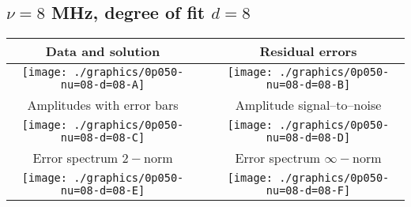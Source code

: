 

% 

\clearpage{}
\break{}

\subsection{$\nu = 8$ MHz, degree of fit $d = 8$}

\begin{table}[h]
    \begin{center}
        \begin{tabular}{ccc}
            Data and solution & \quad & Residual errors \\\hline
            \texttt{[image: ./graphics/0p050-nu=08-d=08-A]} &&
            \texttt{[image: ./graphics/0p050-nu=08-d=08-B]} \\[15pt]
            Amplitudes with error bars && Amplitude signal--to--noise \\\hline
            \texttt{[image: ./graphics/0p050-nu=08-d=08-C]} &&
            \texttt{[image: ./graphics/0p050-nu=08-d=08-D]} \\[15pt]
            Error spectrum $2-$norm && Error spectrum $\infty-$norm \\\hline
            \texttt{[image: ./graphics/0p050-nu=08-d=08-E]} &&
            \texttt{[image: ./graphics/0p050-nu=08-d=08-F]} \\[15pt]
        \end{tabular}
    \end{center}
\label{fig:elev=50, nu=8}
\end{table}



\endinput

